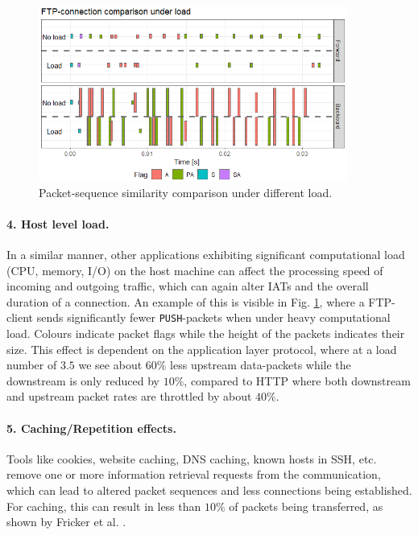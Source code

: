 \documentclass[runningheads]{llncs}
\begin{document}
\begin{figure}
\centering
\includegraphics[width=0.9\textwidth]{images/FTP_load.png}
\caption{Packet-sequence similarity comparison under different load.} %
\label{Fig:FTP_load}
\end{figure}

\paragraph{4. Host level load.}
In a similar manner, other applications exhibiting significant computational load (CPU, memory, I/O) on the host machine can affect the processing speed of incoming and outgoing traffic, which can again alter IATs and the overall duration of a connection. An example of this is visible in Fig. \ref{Fig:FTP_load}, where a FTP-client sends significantly fewer \texttt{PUSH}-packets when under heavy computational load. Colours indicate packet flags while the height of the packets indicates their size. This effect is dependent on the application layer protocol, where at a load number of $3.5$ we see about $60\%$ less upstream data-packets while the downstream is only reduced by $10\%$, compared to HTTP where both downstream and upstream packet rates are throttled by about $40\%$.





\paragraph{5. Caching/Repetition effects.}
Tools like cookies, website caching, DNS caching, known hosts in SSH, etc. remove one or more information retrieval requests from the communication, which can lead to altered packet sequences and less connections being established. For caching, this can result in less than $10\%$ of packets being transferred, as shown by Fricker et al. \cite{fricker2012impact}. 
\end{document}
